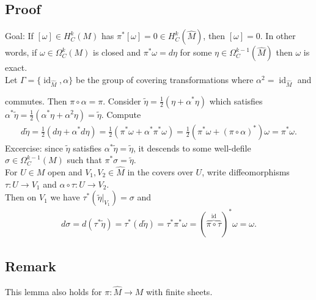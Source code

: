 \documentclass[11pt]{article}
\begin{document}
\subsection*{Proof}
\label{sec:org681feac}
Goal: If \([\omega]\in H^{k}_{C}(M)\) has \(\pi^{*}[\omega]=0\in H^{k}_{C}(\hat{M})\), then \([\omega]=0\). In other words, if \(\omega\in\Omega^{k}_{C}(M)\) is closed and \(\pi^{*}\omega=d\eta\) for some \(\eta\in\Omega_{C}^{k-1}(\hat{M})\) then \(\omega\) is exact.\\
Let \(\Gamma=\{\operatorname{id}_{\hat{M}},\alpha\}\) be the group of covering transformations where \(\alpha^{2}=\operatorname{id}_{\hat{M}}\) and\\
commutes. Then \(\pi\circ\alpha=\pi\). Consider \(\tilde{\eta}=\frac{1}{2}(\eta+\alpha^{*}\eta)\) which satisfies \(\alpha^{*}\tilde{\eta}=\frac{1}{2}(\alpha^{*}\eta+\alpha^{2}\eta)=\tilde{\eta}\). Compute\\
\begin{align*}
  d\tilde{\eta}
  =\frac{1}{2}(d\eta+\alpha^{*}d\eta)
  =\frac{1}{2}(\pi^{*}\omega+\alpha^{*}\pi^{*}\omega)
  =\frac{1}{2}(\pi^{*}\omega+(\pi\circ\alpha)^{*})\omega
  =\pi^{*}\omega.
\end{align*}
Excercise: since \(\tilde{\eta}\) satisfies \(\alpha^{*}\tilde{\eta}=\tilde{\eta}\), it descends to some well-defile \(\sigma\in\Omega_{C}^{k-1}(M)\) such that \(\pi^{*}\sigma=\tilde{\eta}\).\\
For \(U\in M\) open and \(V_{1},V_{2}\in\hat{M}\) in the covers over \(U\), write diffeomorphisms \(\tau:U\to V_{1}\) and \(\alpha\circ\tau:U\to V_{2}\).\\
Then on \(V_{1}\) we have \(\tau^{*}\left( \tilde{\eta}|_{V_{1}} \right)=\sigma\) and\\
\begin{align*}
  d\sigma
  =d(\tau^{*}\tilde{\eta})
  =\tau^{*}(d\tilde{\eta})
  =\tau^{*}\pi^{*}\omega
  =(\overbrace{\pi\circ\tau}^{\operatorname{id}})^{*}\omega
  =\omega.
\end{align*}
\subsection*{Remark}
\label{sec:org2f533af}
This lemma also holds for \(\pi:\hat{M}\to M\) with finite sheets.\\
\end{document}
